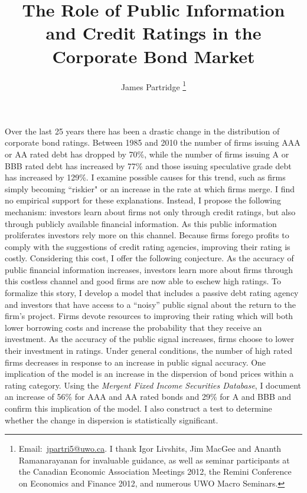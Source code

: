 \documentclass[notitlepage]{article}
\title{The Role of Public Information and Credit Ratings in the Corporate Bond Market}
\author{James Partridge%
\thanks{Email:~\href{mailto:jpartri5@uwo.ca}{jpartri5@uwo.ca}. I thank Igor Livshits, Jim MacGee and Ananth Ramanarayanan for invaluable guidance, as well as seminar participants at the Canadian Economic Association Meetings 2012, the Remini Conference on Economics and Finance 2012, and numerous UWO Macro Seminars.}}
\affil{The University of Western Ontario}
\date{}
\begin{document}
\maketitle
\vspace{-25pt}
\begin{onecolabstract}
Over the last 25 years there has been a drastic change in the distribution of corporate bond ratings. Between 1985 and 2010 the number of firms issuing AAA or AA rated debt has dropped by 70\%, while the number of firms issuing A or BBB rated debt has increased by 77\% and those issuing speculative grade debt has increased by 129\%. I examine possible causes for this trend, such as firms simply becoming ``riskier" or an increase in the rate at which firms merge. I find no empirical support for these explanations. Instead, I propose the following mechanism: investors learn about firms not only through credit ratings, but also through publicly available financial information. As this public information proliferates investors rely more on this channel. Because firms forego profits to comply with the suggestions of credit rating agencies, improving their rating is costly. Considering this cost, I offer the following conjecture. As the accuracy of public financial information increases, investors learn more about firms through this costless channel and good firms are now able to eschew high ratings. To formalize this story, I develop a model that includes a passive debt rating agency and investors that have access to a ``noisy'' public signal about the return to the firm's project. Firms devote resources to improving their rating which will both lower borrowing costs and increase the probability that they receive an investment.  As the accuracy of the public signal increases, firms choose to lower their investment in ratings. Under general conditions, the number of high rated firms decreases in response to an increase in public signal accuracy. One implication of the model is an increase in the dispersion of bond prices within a rating category. Using the \textit{Mergent Fixed Income Securities Database}, I document an increase of 56\% for AAA and AA rated bonds and 29\% for A and BBB and confirm this implication of the model. I also construct a test to determine whether the change in dispersion is statistically significant.
\end{onecolabstract}

\clearpage
\end{document}
